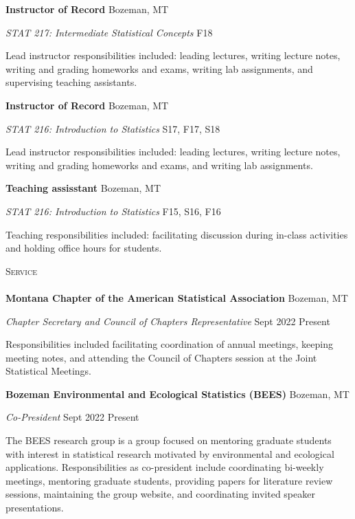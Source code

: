 \documentclass[a4paper]{article}
\newcommand{\lineunder} {
	\vspace*{-8pt} \\
	\hspace*{-18pt} \hrulefill \\
}
\newcommand{\header} [1] {
	{\hspace*{-18pt}\vspace*{6pt} \textsc{#1}}
	\vspace*{-6pt} \lineunder
}
\begin{document}
\textbf{Instructor of Record} \hfill Bozeman, MT

\emph{STAT 217: Intermediate Statistical Concepts} \hfill F18

Lead instructor responsibilities included: leading lectures, writing
lecture notes, writing and grading homeworks and exams, writing lab
assignments, and supervising teaching assistants. \vspace*{2mm}

\textbf{Instructor of Record} \hfill Bozeman, MT

\emph{STAT 216: Introduction to Statistics} \hfill S17, F17, S18

Lead instructor responsibilities included: leading lectures, writing
lecture notes, writing and grading homeworks and exams, and writing lab
assignments. \vspace*{2mm}

\textbf{Teaching assisstant} \hfill Bozeman, MT

\emph{STAT 216: Introduction to Statistics} \hfill F15, S16, F16

Teaching responsibilities included: facilitating discussion during
in-class activities and holding office hours for students. \vspace*{2mm}

\header{Service}

\textbf{Montana Chapter of the American Statistical Association}
\hfill Bozeman, MT

\emph{Chapter Secretary and Council of Chapters Representative}
\hfill Sept 2022 \textbar{} Present

Responsibilities included facilitating coordination of annual meetings,
keeping meeting notes, and attending the Council of Chapters session at
the Joint Statistical Meetings. \vspace*{2mm}

\textbf{Bozeman Environmental and Ecological Statistics (BEES)}
\hfill Bozeman, MT

\emph{Co-President} \hfill Sept 2022 \textbar{} Present

The BEES research group is a group focused on mentoring graduate
students with interest in statistical research motivated by
environmental and ecological applications. Responsibilities as
co-president include coordinating bi-weekly meetings, mentoring graduate
students, providing papers for literature review sessions, maintaining
the group website, and coordinating invited speaker presentations.
\vspace*{2mm}
\end{document}

